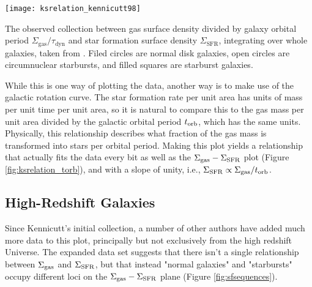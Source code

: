 \begin{marginfigure}
\texttt{[image: ksrelation\_kennicutt98]}
\caption[Whole-galaxy Kennicutt-Schmidt relation, including orbital time]{
\label{fig:ksrelation_torb}
The observed collection between gas surface density divided by galaxy orbital period $\Sigma_{\mathrm{gas}}/\tau_{\mathrm{dyn}}$ and star formation surface density $\Sigma_{\mathrm{SFR}}$, integrating over whole galaxies, taken from \citet{kennicutt98a}. Filed circles are normal disk galaxies, open circles are circumnuclear starbursts, and filled squares are starburst galaxies.
}
\end{marginfigure}

While this is one way of plotting the data, another way is to make use of the galactic rotation curve. The star formation rate per unit area has units of mass per unit time per unit area, so it is natural to compare this to the gas mass per unit area divided by the galactic orbital period $t_{\rm orb}$, which has the same units. Physically, this relationship describes what fraction of the gas mass is transformed into stars per orbital period. Making this plot yields a relationship that actually fits the data every bit as well as the $\Sigma_{\rm gas} - \Sigma_{\rm SFR}$ plot (Figure \ref{fig:ksrelation_torb}), and with a slope of unity, i.e., $\Sigma_{\rm SFR} \propto \Sigma_{\rm gas}/t_{\rm orb}$.

\subsection{High-Redshift Galaxies}

Since Kennicutt's initial collection, a number of other authors have added much more data to this plot, principally but not exclusively from the high redshift Universe. The expanded data set suggests that there isn't a single relationship between $\Sigma_{\rm gas}$ and $\Sigma_{\rm SFR}$, but that instead "normal galaxies" and "starbursts" occupy different loci on the $\Sigma_{\rm gas} - \Sigma_{\rm SFR}$ plane (Figure \ref{fig:sfsequences}).

